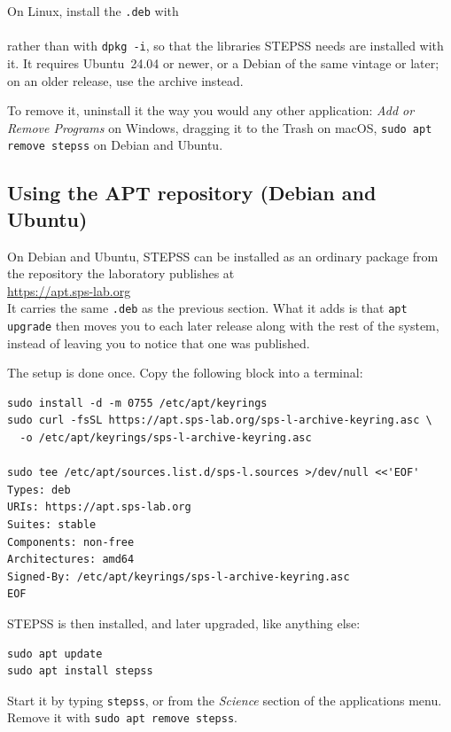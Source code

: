 On Linux, install the {\tt .deb} with\\
\\
rather than with {\tt dpkg -i}, so that the libraries STEPSS needs are installed with it. It requires Ubuntu~24.04 or newer, or a Debian of the same vintage or later; on an older release, use the archive instead.

To remove it, uninstall it the way you would any other application: {\em Add or Remove Programs} on Windows, dragging it to the Trash on macOS, {\tt sudo apt remove stepss} on Debian and Ubuntu.

\subsection{Using the APT repository (Debian and Ubuntu)}

On Debian and Ubuntu, STEPSS can be installed as an ordinary package from the repository the laboratory publishes at\\
\hspace*{5ex}\url{https://apt.sps-lab.org}\\
It carries the same {\tt .deb} as the previous section. What it adds is that {\tt apt upgrade} then moves you to each later release along with the rest of the system, instead of leaving you to notice that one was published.

The setup is done once. Copy the following block into a terminal:

\begin{verbatim}
sudo install -d -m 0755 /etc/apt/keyrings
sudo curl -fsSL https://apt.sps-lab.org/sps-l-archive-keyring.asc \
  -o /etc/apt/keyrings/sps-l-archive-keyring.asc

sudo tee /etc/apt/sources.list.d/sps-l.sources >/dev/null <<'EOF'
Types: deb
URIs: https://apt.sps-lab.org
Suites: stable
Components: non-free
Architectures: amd64
Signed-By: /etc/apt/keyrings/sps-l-archive-keyring.asc
EOF
\end{verbatim}

STEPSS is then installed, and later upgraded, like anything else:

\begin{verbatim}
sudo apt update
sudo apt install stepss
\end{verbatim}

Start it by typing {\tt stepss}, or from the {\em Science} section of the applications menu. Remove it with {\tt sudo apt remove stepss}.

